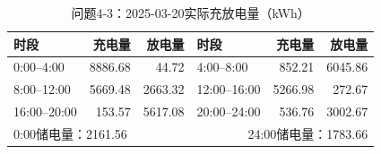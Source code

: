 \begin{table}[H]\centering\small
\caption{问题4-3：2025-03-20实际充放电量（kWh）}
\label{tab:q4_3_0320_storage}
\begin{tabular}{lrrlrr}\toprule
时段 & 充电量 & 放电量 & 时段 & 充电量 & 放电量\\\midrule
0:00--4:00 & 8886.68 & 44.72 & 4:00--8:00 & 852.21 & 6045.86 \\
8:00--12:00 & 5669.48 & 2663.32 & 12:00--16:00 & 5266.98 & 272.67 \\
16:00--20:00 & 153.57 & 5617.08 & 20:00--24:00 & 536.76 & 3002.67 \\
\midrule\multicolumn{3}{l}{0:00储电量：2161.56} & \multicolumn{3}{r}{24:00储电量：1783.66}\\
\bottomrule\end{tabular}\end{table}

